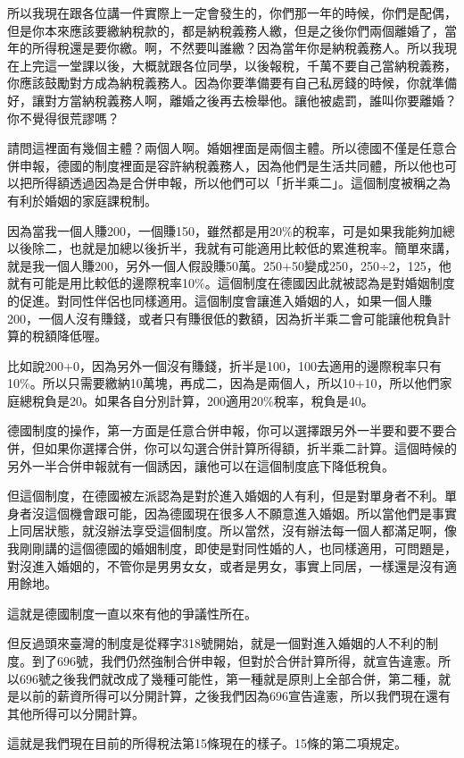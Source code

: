 \documentclass[]{ctexbook}
\begin{document}
所以我現在跟各位講一件實際上一定會發生的，你們那一年的時候，你們是配偶，但是你本來應該要繳納稅款的，都是納稅義務人繳，但是之後你們兩個離婚了，當年的所得稅還是要你繳。啊，不然要叫誰繳？因為當年你是納稅義務人。所以我現在上完這一堂課以後，大概就跟各位同學，以後報稅，千萬不要自己當納稅義務，你應該鼓勵對方成為納稅義務人。因為你要準備要有自己私房錢的時候，你就準備好，讓對方當納稅義務人啊，離婚之後再去檢舉他。讓他被處罰，誰叫你要離婚？你不覺得很荒謬嗎？

請問這裡面有幾個主體？兩個人啊。婚姻裡面是兩個主體。所以德國不僅是任意合併申報，德國的制度裡面是容許納稅義務人，因為他們是生活共同體，所以他也可以把所得額透過因為是合併申報，所以他們可以「折半乘二」。這個制度被稱之為有利於婚姻的家庭課稅制。

因為當我一個人賺200，一個賺150，雖然都是用20\%的稅率，可是如果我能夠加總以後除二，也就是加總以後折半，我就有可能適用比較低的累進稅率。簡單來講，就是我一個人賺200，另外一個人假設賺50萬。250+50變成250，250÷2，125，他就有可能是用比較低的邊際稅率10\%。這個制度在德國因此就被認為是對婚姻制度的促進。對同性伴侶也同樣適用。這個制度會讓進入婚姻的人，如果一個人賺200，一個人沒有賺錢，或者只有賺很低的數額，因為折半乘二會可能讓他稅負計算的稅額降低喔。

比如說200+0，因為另外一個沒有賺錢，折半是100，100去適用的邊際稅率只有10\%。所以只需要繳納10萬塊，再成二，因為是兩個人，所以10+10，所以他們家庭總稅負是20。如果各自分別計算，200適用20\%稅率，稅負是40。

德國制度的操作，第一方面是任意合併申報，你可以選擇跟另外一半要和要不要合併，但如果你選擇合併，你可以勾選合併計算所得額，折半乘二計算。這個時候的另外一半合併申報就有一個誘因，讓他可以在這個制度底下降低稅負。

但這個制度，在德國被左派認為是對於進入婚姻的人有利，但是對單身者不利。單身者沒這個機會跟可能，因為德國現在很多人不願意進入婚姻。所以當他們是事實上同居狀態，就沒辦法享受這個制度。所以當然，沒有辦法每一個人都滿足啊，像我剛剛講的這個德國的婚姻制度，即使是對同性婚的人，也同樣適用，可問題是，對沒進入婚姻的，不管你是男男女女，或者是男女，事實上同居，一樣還是沒有適用餘地。

這就是德國制度一直以來有他的爭議性所在。

但反過頭來臺灣的制度是從釋字318號開始，就是一個對進入婚姻的人不利的制度。到了696號，我們仍然強制合併申報，但對於合併計算所得，就宣告違憲。所以696號之後我們就改成了幾種可能性，第一種就是原則上全部合併，第二種，就是以前的薪資所得可以分開計算，之後我們因為696宣告違憲，所以我們現在還有其他所得可以分開計算。

這就是我們現在目前的所得稅法第15條現在的樣子。15條的第二項規定。
\end{document}
